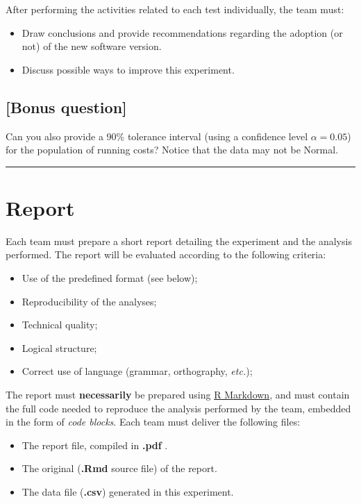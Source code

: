 \documentclass[11pt,twoside,printwatermark=false]{pinp}
\providecommand{\tightlist}{%
  \setlength{\itemsep}{0pt}\setlength{\parskip}{0pt}}
\begin{document}
After performing the activities related to each test individually, the
team must:

\begin{itemize}
\tightlist
\item
  Draw conclusions and provide recommendations regarding the adoption
  (or not) of the new software version.
\item
  Discuss possible ways to improve this experiment.
\end{itemize}

\subsection{{[}Bonus question{]}}\label{bonus-question}

Can you also provide a 90\% tolerance interval (using a confidence level
\(\alpha = 0.05\)) for the population of running costs? Notice that the
data may not be Normal.

\begin{center}\rule{0.5\linewidth}{\linethickness}\end{center}

\newpage

\section{Report}\label{report}

Each team must prepare a short report detailing the experiment and the
analysis performed. The report will be evaluated according to the
following criteria:

\begin{itemize}
\tightlist
\item
  Use of the predefined format (see below);
\item
  Reproducibility of the analyses;
\item
  Technical quality;
\item
  Logical structure;
\item
  Correct use of language (grammar, orthography, \emph{etc.});
\end{itemize}

The report must \textbf{necessarily} be prepared using
\href{http://rmarkdown.rstudio.com}{R Markdown}, and must contain the
full code needed to reproduce the analysis performed by the team,
embedded in the form of \emph{code blocks}. Each team must deliver the
following files:

\begin{itemize}
\tightlist
\item
  The report file, compiled in \textbf{.pdf} .
\item
  The original (\textbf{.Rmd} source file) of the report.
\item
  The data file (\textbf{.csv}) generated in this experiment.
\end{itemize}
\end{document}
